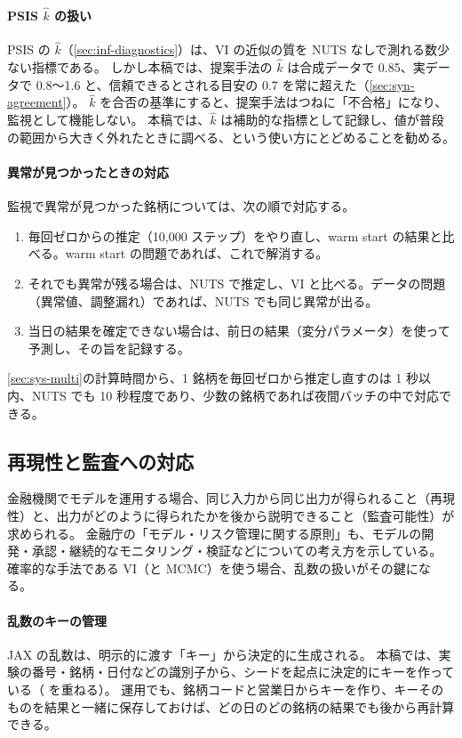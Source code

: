 \paragraph{PSIS $\hat k$ の扱い}
PSIS の $\hat k$（\cref{sec:inf-diagnostics}）は、VI の近似の質を NUTS なしで測れる数少ない指標である。
しかし本稿では、提案手法の $\hat k$ は合成データで 0.85、実データで 0.8〜1.6 と、信頼できるとされる目安の 0.7 を常に超えた（\cref{sec:syn-agreement}）。
$\hat k$ を合否の基準にすると、提案手法はつねに「不合格」になり、監視として機能しない。
本稿では、$\hat k$ は補助的な指標として記録し、値が普段の範囲から大きく外れたときに調べる、という使い方にとどめることを勧める。

\paragraph{異常が見つかったときの対応}
監視で異常が見つかった銘柄については、次の順で対応する。
\begin{enumerate}
  \item 毎回ゼロからの推定（10,000 ステップ）をやり直し、warm start の結果と比べる。warm start の問題であれば、これで解消する。
  \item それでも異常が残る場合は、NUTS で推定し、VI と比べる。データの問題（異常値、調整漏れ）であれば、NUTS でも同じ異常が出る。
  \item 当日の結果を確定できない場合は、前日の結果（変分パラメータ）を使って予測し、その旨を記録する。
\end{enumerate}
\cref{sec:sys-multi}の計算時間から、1 銘柄を毎回ゼロから推定し直すのは 1 秒以内、NUTS でも 10 秒程度であり、少数の銘柄であれば夜間バッチの中で対応できる。

\subsection{再現性と監査への対応}\label{sec:sys-repro}

金融機関でモデルを運用する場合、同じ入力から同じ出力が得られること（再現性）と、出力がどのように得られたかを後から説明できること（監査可能性）が求められる。
金融庁の「モデル・リスク管理に関する原則」\parencite{fsa2021mrm}も、モデルの開発・承認・継続的なモニタリング・検証などについての考え方を示している。
確率的な手法である VI（と MCMC）を使う場合、乱数の扱いがその鍵になる。

\paragraph{乱数のキーの管理}
JAX の乱数は、明示的に渡す「キー」から決定的に生成される。
本稿では、実験の番号・銘柄・日付などの識別子から、シードを起点に決定的にキーを作っている（ を重ねる）。
運用でも、銘柄コードと営業日からキーを作り、キーそのものを結果と一緒に保存しておけば、どの日のどの銘柄の結果でも後から再計算できる。

